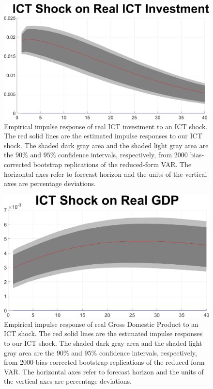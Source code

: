 \documentclass[12pt]{article}
\begin{document}
	\begin{figure}[h!]
		\begin{center}
		\includegraphics[scale=0.35]{MainFigures/fig_ICT_Shock_on_Real_ICT_Investment_empirical_noH}
		\caption{Empirical impulse response of real ICT investment to an ICT shock. The red solid lines are the estimated impulse responses to our ICT shock. The shaded dark gray area and the shaded light gray area are the $90$\% and $95$\% confidence intervals, respectively, from 2000 bias-corrected bootstrap replications of the reduced-form VAR. The horizontal axes refer to forecast horizon and the units of the vertical axes are percentage deviations.}
		\label{fig:ICT_main}
	\end{center} 
	\end{figure}


	\begin{figure}[h!]
	\begin{center}
		\includegraphics[scale=0.35]{MainFigures/fig_ICT_Shock_on_Real_GDP_empirical_noH}
		\caption{Empirical impulse response of real Gross Domestic Product to an ICT shock. The red solid lines are the estimated impulse responses to our ICT shock. The shaded dark gray area and the shaded light gray area are the $90$\% and $95$\% confidence intervals, respectively, from 2000 bias-corrected bootstrap replications of the reduced-form VAR. The horizontal axes refer to forecast horizon and the units of the vertical axes are percentage deviations.}
		\label{fig:GDP_main}
	\end{center} 
\end{figure}
\end{document}
